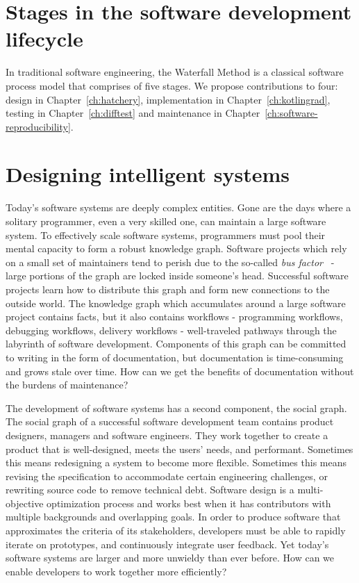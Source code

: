 \documentclass[12pt,initial,twoside,maitrise]{dms}
\numberwithin{equation}{section}
\numberwithin{table}{chapter}
\numberwithin{figure}{chapter}
\begin{document}
\section{Stages in the software development lifecycle}\label{sec:sldc-stages}

In traditional software engineering, the Waterfall Method is a classical software process model that comprises of five stages. We propose contributions to four: design in Chapter~\ref{ch:hatchery}, implementation in Chapter~\ref{ch:kotlingrad}, testing in Chapter~\ref{ch:difftest} and maintenance in Chapter~\ref{ch:software-reproducibility}.

\section{Designing intelligent systems}

Today's software systems are deeply complex entities. Gone are the days where a solitary programmer, even a very skilled one, can maintain a large software system. To effectively scale software systems, programmers must pool their mental capacity to form a robust knowledge graph. Software projects which rely on a small set of maintainers tend to perish due to the so-called \textit{bus factor}~\cite{cosentino2015assessing} - large portions of the graph are locked inside someone's head. Successful software projects learn how to distribute this graph and form new connections to the outside world. The knowledge graph which accumulates around a large software project contains facts, but it also contains workflows - programming workflows, debugging workflows, delivery workflows - well-traveled pathways through the labyrinth of software development. Components of this graph can be committed to writing in the form of documentation, but documentation is time-consuming and grows stale over time. How can we get the benefits of documentation without the burdens of maintenance?

The development of software systems has a second component, the social graph. The social graph of a successful software development team contains product designers, managers and software engineers. They work together to create a product that is well-designed, meets the users' needs, and performant. Sometimes this means redesigning a system to become more flexible. Sometimes this means  revising the specification to accommodate certain engineering challenges, or rewriting source code to remove technical debt. Software design is a multi-objective optimization process and works best when it has contributors with multiple backgrounds and overlapping goals. In order to produce software that approximates the criteria of its stakeholders, developers must be able to rapidly iterate on prototypes, and continuously integrate user feedback. Yet today's software systems are larger and more unwieldy than ever before. How can we enable developers to work together more efficiently?
\end{document}
